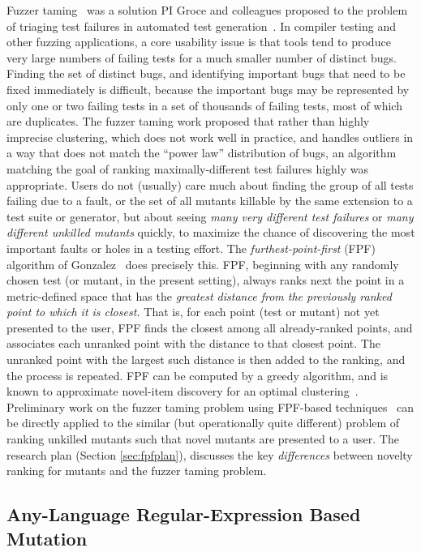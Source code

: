 Fuzzer taming~\cite{PLDI13} was a solution PI Groce and colleagues proposed to the problem
of triaging test failures in automated test generation~\cite{SemCrash}.  In compiler
testing and other fuzzing applications, a core usability issue is that
tools tend to produce very large numbers of failing tests for a much
smaller number of distinct bugs.  Finding the set of distinct bugs,
and identifying important bugs that need to be fixed immediately is
difficult, because the important bugs may be represented by only one
or two failing tests in a set of thousands of failing tests, most of
which are duplicates.  The fuzzer taming work proposed that rather than highly imprecise
clustering, which does not work well in practice, and handles outliers
in a way that does not match the ``power law'' distribution of bugs, an
algorithm matching the goal of ranking maximally-different test
failures highly was appropriate.  Users do not (usually) care much
about finding the group of all tests failing due to a fault, or the
set of all mutants killable by the same extension to a test suite or
generator, but about seeing \emph{many very different test failures} or \emph{many
  different unkilled mutants} quickly, to maximize the chance of
discovering the most important faults or holes in a testing effort.
The \emph{furthest-point-first} (FPF) algorithm of
Gonzalez~\cite{Gonzalez85} does precisely this.  FPF, beginning with
any randomly chosen test (or mutant, in the present setting), always ranks
next the point in a metric-defined space that has the \emph{greatest
  distance from the previously ranked point to which it is closest.}
That is, for each point (test or mutant) not yet presented to the
user, FPF finds the closest among all already-ranked points, and
associates each unranked point with the distance to that closest
point.  The unranked point with the largest such distance is then
added to the ranking, and the process is repeated.  FPF can be
computed by a greedy algorithm, and is known to approximate novel-item
discovery for an optimal clustering~\cite{Gonzalez85}.  Preliminary work on the fuzzer taming problem using FPF-based
techniques~\cite{PLDI13,distMut} can be directly applied
to the similar (but operationally quite different) problem of ranking
unkilled mutants such that novel mutants are presented to a user.  The
research plan (Section
\ref{sec:fpfplan}), discusses the key \emph{differences} between novelty ranking
for mutants and
the fuzzer taming problem.

\subsection{Any-Language Regular-Expression Based Mutation}

